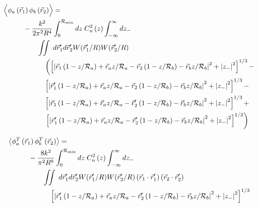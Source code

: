 \begin{equation}\label{prphase_n4}
\begin{aligned}
& \left\langle \vphantom{\hat{\phi}_{a}} \phi_{a}\left(\vec{r}_{1}\right) \phi_{b}\left(\vec{r}_{2}\right)\right\rangle = \\
&\quad\quad\quad
-\frac{k^{2}}{2\pi^{2}R^{4}} \int_{0}^{\mathcal{R}_{\rm min}} dz\;C_{n}^{2}\left(z\right)
\int_{-\infty}^{\infty} dz_{-}\\
&\quad\quad\quad\quad\quad 
\iint \; d\vec{r}^{\prime}_{1}d\vec{r}^{\prime}_{2}  
W(\vec{r}^{\prime}_{1}/R) W(\vec{r}^{\prime}_{2}/R) \\
&\quad\quad\quad\quad\quad\quad
\left(
\left[ \left\vert \vec{r}_{1}\left(1-z/\mathcal{R}_{a}\right) + \vec{r}_{a} z/\mathcal{R}_{a} - 
\vec{r}_{2}\left(1-z/\mathcal{R}_{b}\right) - \vec{r}_{b} z/\mathcal{R}_{b}\right\vert^{2} + 
\left\vert z_{-} \right\vert^{2}\right]^{1/3} -
\right. \\
& \quad\quad\quad\quad\quad\quad
\left[ \left\vert \vec{r}^{\prime}_{1}\left(1-z/\mathcal{R}_{a}\right) + \vec{r}_{a} z/\mathcal{R}_{a} - 
\vec{r}_{2}\left(1-z/\mathcal{R}_{b}\right) - \vec{r}_{b} z/\mathcal{R}_{b}\right\vert^{2} + 
\left\vert z_{-} \right\vert^{2}\right]^{1/3} - \\
& \quad\quad\quad\quad\quad\quad
\left[ \left\vert \vec{r}_{1}\left(1-z/\mathcal{R}_{a}\right) + \vec{r}_{a} z/\mathcal{R}_{a} - 
\vec{r}^{\prime}_{2}\left(1-z/\mathcal{R}_{b}\right) - \vec{r}_{b} z/\mathcal{R}_{b}\right\vert^{2} + 
\left\vert z_{-} \right\vert^{2}\right]^{1/3} + \\
& \quad\quad\quad\quad\quad\quad
\left.
\left[ \left\vert \vec{r}^{\prime}_{1}\left(1-z/\mathcal{R}_{a}\right) + \vec{r}_{a} z/\mathcal{R}_{a} - 
\vec{r}^{\prime}_{2}\left(1-z/\mathcal{R}_{b}\right) - \vec{r}_{b} z/\mathcal{R}_{b}\right\vert^{2} + 
\left\vert z_{-} \right\vert^{2}\right]^{1/3}\right)
\end{aligned}
\end{equation}

\begin{equation}\label{tphase_n4}
\begin{aligned}
&\left\langle \phi^{T}_{a}\left(\vec{r}_{1}\right) \phi^{T}_{b}\left(\vec{r}_{2}\right)\right\rangle = \\
&\quad\quad\quad
-\frac{8k^{2}}{\pi^{2}R^{8}} \int_{0}^{\mathcal{R}_{\rm min}} dz\;C_{n}^{2}\left(z\right)
\int_{-\infty}^{\infty} dz_{-} \\
&\quad\quad\quad\quad\quad 
\iint \; d\vec{r}^{\prime}_{1}d\vec{r}^{\prime}_{2} W(\vec{r}^{\prime}_{1}/R) W(\vec{r}^{\prime}_{2}/R)
\left(\vec{r}_{1} \cdot \vec{r}^{\prime}_{1}\right)
\left(\vec{r}_{2} \cdot \vec{r}^{\prime}_{2}\right)
\\
&\quad\quad\quad\quad\quad\quad
\left[ \left\vert \vec{r}^{\prime}_{1}\left(1-z/\mathcal{R}_{a}\right) + \vec{r}_{a} z/\mathcal{R}_{a} - 
 \vec{r}^{\prime}_{2}\left(1-z/\mathcal{R}_{b}\right) - \vec{r}_{b} z/\mathcal{R}_{b}\right\vert^{2} + 
\left\vert z_{-} \right\vert^{2} \right]^{1/3}
\end{aligned}
\end{equation}

